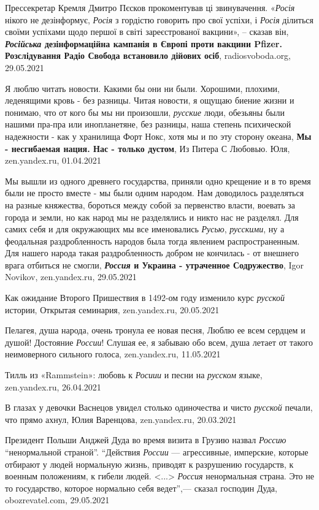Прессекретар Кремля Дмитро Пєсков прокоментував ці звинувачення. «\emph{Росія}
нікого не дезінформує, \emph{Росія} з гордістю говорить про свої успіхи, і
\emph{Росія} ділиться своїми успіхами щодо першої в світі зареєстрованої
вакцини», – сказав він, \textbf{\emph{Російська} дезінформаційна кампанія в
Європі проти вакцини Pfizer. Розслідування Радіо Свобода встановило дійових
осіб}, radiosvoboda.org, 29.05.2021

Я люблю читать новости. Какими бы они ни были. Хорошими, плохими, леденящими
кровь - без разницы. Читая новости, я ощущаю биение жизни и понимаю, что от
кого бы мы ни произошли, \emph{русские} люди, обезьяны были нашими пра-пра или
инопланетяне, без разницы, наша степень психической надежности - как у
хранилища Форт Нокс, хотя мы и по эту сторону океана, \textbf{Мы - несгибаемая
нация. Нас - только дустом}, Из Питера С Любовью. Юля, zen.yandex.ru,
01.04.2021

Мы вышли из одного древнего государства, приняли одно крещение и в то время
были не просто вместе - мы были одним народом. Нам доводилось разделяться на
разные княжества, бороться между собой за первенство власти, воевать за города
и земли, но как народ мы не разделялись и никто нас не разделял. Для самих себя
и для окружающих мы все именовались \emph{Русью}, \emph{русскими}, ну а
феодальная раздробленность народов была тогда явлением распространенным. Для
нашего народа такая раздробленность добром не кончилась - от внешнего врага
отбиться не смогли, \textbf{\emph{Россия} и Украина - утраченное Содружество},
Igor Novikov, zen.yandex.ru, 29.05.2021

Как ожидание Второго Пришествия в 1492-ом году изменило курс \emph{русской}
истории, Открытая семинария, zen.yandex.ru, 20.05.2021

Пелагея, душа народа, очень тронула ее новая песня, Люблю ее всем сердцем и
душой! Достояние \emph{России}! Слушая ее, я забываю обо всем, душа летает от
такого неимоверного сильного голоса, zen.yandex.ru, 11.05.2021

Тилль из «Rammstein»: любовь к \emph{Росиии} и песни на \emph{русском} языке,
zen.yandex.ru, 26.04.2021

В глазах у девочки Васнецов увидел столько одиночества и чисто \emph{русской}
печали, что прямо ахнул, Юлия Варенцова, zen.yandex.ru, 20.03.2021

Президент Польши Анджей Дуда во время визита в Грузию назвал \emph{Россию}
\enquote{ненормальной страной}.  \enquote{Действия \emph{России} — агрессивные,
имперские, которые отбирают у людей нормальную жизнь, приводят к разрушению
государств, к военным положениям, к гибели людей. <...> \emph{Россия} ненормальная
страна. Это не то государство, которое нормально себя ведет},— сказал господин
Дуда, obozrevatel.com, 29.05.2021

